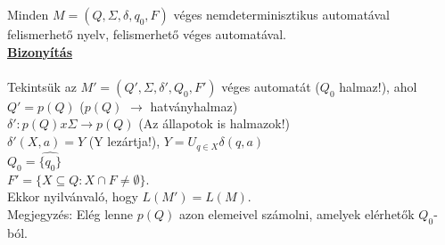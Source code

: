 \begin{frame}
\begin{tcolorbox}[title={Tétel: Nemdeterminisztikus automata}]
Minden $M = (Q, \Sigma , \delta , q_0, F)$ véges nemdeterminisztikus automatával felismerhető nyelv, felismerhető véges automatával.\\
\tcblower
\msmallskip
\underline{\textbf{Bizonyítás}}\\
\mmedskip
\\
Tekintsük az $M' = (Q', \Sigma , {\delta}', Q_0, F')$ véges automatát ($Q_0$ halmaz!), ahol\\
$Q' = p(Q)$ ($p(Q)$ $\rightarrow$ hatványhalmaz)\\
${\delta}' : p(Q) x \Sigma \rightarrow p(Q)$ (Az állapotok is halmazok!)\\
${\delta}'(X, a) = \widehat{Y}$ (Y lezártja!), $Y = U_{q \in X} \delta(q, a)$\\
$Q_0 = \widehat{\{q_0\}}$\\
$F' = \{X \subseteq Q : X \cap F \neq \emptyset \}$.\\
Ekkor nyilvánvaló, hogy $L(M') = L(M)$.\\
Megjegyzés: Elég lenne $p(Q)$ azon elemeivel számolni, amelyek elérhetők $Q_0$-ból.

\end{tcolorbox}

\end{frame}


